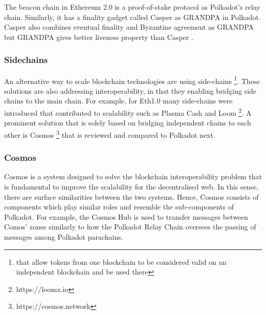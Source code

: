 \documentclass{article}
\begin{document}
\begin{appendix}
The beacon chain in Ethereum 2.0 is a proof-of-stake protocol as Polkadot's relay chain. Similarly, it has a finality gadget called Casper \cite{CasperFFG,CasperCBC} as GRANDPA in Polkadot. Casper also combines  eventual finality and  Byzantine agreement as GRANDPA but GRANDPA gives better liveness property than Casper \cite{2018:Stewart:Grandpa}.


\subsubsection{Sidechains}
An alternative way to scale blockchain technologies are using side-chains \footnote{that allow tokens from one blockchain to be considered valid on an independent blockchain and be used there}. These solutions are also addressing interoperability, in that they enabling bridging side chains to the main chain. For example, for Eth1.0 many side-chains were introduced that contributed to scalability such as Plasma Cash and Loom \footnote{https://loomx.io}.
A prominent solution that is solely based on bridging independent chains to each other is Cosmos \footnote{https://cosmos.network} that is reviewed and compared to Polkadot next.



\subsubsection{Cosmos}

Cosmos is a system designed to solve the blockchain interoperability problem that is fundamental to improve the scalability for the decentralised web. In this sense, there are surface similarities between the two systems. Hence, Cosmos consists of components which play similar roles and resemble the sub-components of Polkadot. For example, the Cosmos Hub is used to transfer messages between Comos' zones similarly to how the Polkadot Relay Chain oversees the passing of messages among Polkadot parachains.


\end{appendix}
\end{document}
